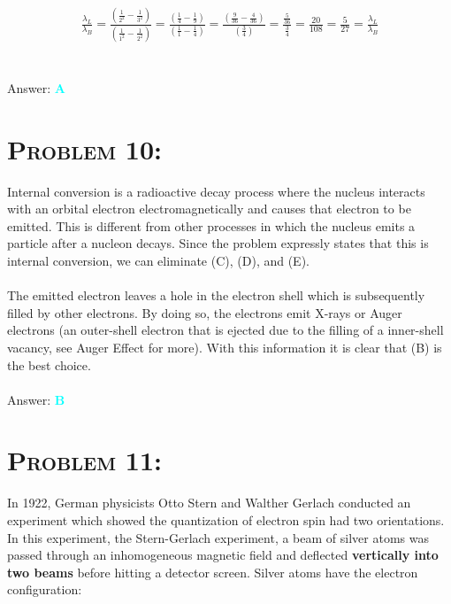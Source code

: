 \documentclass{article}
\begin{document}
\begin{gather}
\frac{\lambda_{L}}{\lambda_{B}} = \frac{ \left(  \frac{1}{2^{2}} - \frac{1}{3^{2}}  \right)}{ \left(  \frac{1}{1^{2}} - \frac{1}{2^{2}}  \right)}
= \frac{ \left(  \frac{1}{4} - \frac{1}{9}  \right)}{ \left(  \frac{1}{1} - \frac{1}{4}  \right)} =  \frac{ \left(  \frac{9}{36} - \frac{4}{36}  \right)}{ \left(  \frac{3}{4} \right)} = \frac{\frac{5}{36}}{\frac{3}{4}} =  \frac{20}{108} = \boxed{\frac{5}{27} = \frac{\lambda_{L}}{\lambda_{B}}}\nonumber
\end{gather}
\\\\
Answer: \textbf{\textcolor{cyan}A}\\


\section{\textsc{Problem 10:}} Internal conversion is a radioactive decay process where the nucleus interacts with an orbital electron electromagnetically and causes that electron to be emitted. This is different from other processes in which the nucleus emits a particle after a nucleon decays. Since the problem expressly states that this is internal conversion, we can eliminate (C), (D), and (E). \\
\\
The emitted electron leaves a hole in the electron shell which is subsequently filled by other electrons. By doing so, the electrons emit X-rays or Auger electrons (an outer-shell electron that is ejected due to the filling of a inner-shell vacancy, see Auger Effect for more). With this information it is clear that (B) is the best choice.
\\\\
Answer: \textbf{\textcolor{cyan}B}\\


\section{\textsc{Problem 11:}} In 1922, German physicists Otto Stern and Walther Gerlach conducted an experiment which showed the quantization of electron spin had two orientations. In this experiment, the Stern-Gerlach experiment, a beam of silver atoms was passed through an inhomogeneous magnetic field and deflected \textbf{vertically into two beams} before hitting a detector screen. Silver atoms have the electron configuration: \\
\end{document}
